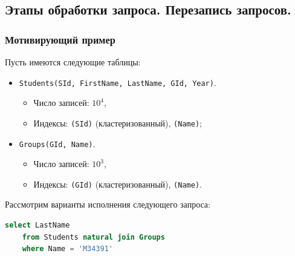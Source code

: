 \subsection{Этапы обработки запроса. Перезапись запросов.}

\subsubsection{Мотивирующий пример}

Пусть имеются следующие таблицы:

\begin{itemize}
	\item \texttt{Students(SId, FirstName, LastName, GId, Year)}.
	      \begin{itemize}
		      \item  Число записей: $10^4$,
		      \item Индексы: \texttt{(SId)} (кластеризованный), \texttt{(Name)};
	      \end{itemize}
	\item \texttt{Groups(GId, Name)}.
	      \begin{itemize}
		      \item  Число записей: $10^3$,
		      \item Индексы: \texttt{(GId)} (кластеризованный), \texttt{(Name)}.
	      \end{itemize}
\end{itemize}

Рассмотрим варианты исполнения следующего запроса:

\begin{lstlisting}[language=SQL]
    select LastName
    from Students natural join Groups
    where Name = 'M34391'
\end{lstlisting}

